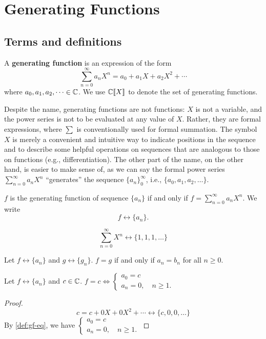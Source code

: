 \documentclass[a4paper, 12pt]{report}
\begin{document}
{\let\clearpage\relax\chapter{Generating Functions}\label{ch:gf}}
\section{Terms and definitions}
\begin{defn}\label{def:gf-def}
A \textbf{generating function} is an expression of the form 
\[\sum_{n = 0}^{\infty} a_n X^n = a_0 + a_1 X + a_2 X^2 + \cdots\]
where $a_0, a_1, a_2, \dots \in \mathbb{C}$. We use $\mathbb{C}\llbracket X \rrbracket$ to denote the set of generating functions.
\end{defn}

Despite the name, generating functions are not functions: $X$ is not a variable, and the power series is not to be evaluated at any value of $X$. Rather, they are formal expressions, where $\sum$ is conventionally used for formal summation. The symbol $X$ is merely a convenient and intuitive way to indicate positions in the sequence and to describe some helpful operations on sequences that are analogous to those on functions (e.g., differentiation). The other part of the name, on the other hand, is easier to make sense of, as we can say the formal power series $\sum_{n = 0}^{\infty} a_n X^n$ ``generates'' the sequence $\{a_n\}_0^\infty$, i.e., $\{a_0, a_1, a_2, \dots\}$.

\begin{defn}\label{def:gf-seq}
 $f$ is the generating function of sequence $\{a_n\}$ if and only if $f = \sum_{n = 0}^{\infty} a_n X^n$. We write 
 \[f \longleftrightarrow \{a_n\}.\]
\end{defn}
\begin{ex*}\label{ex:gf-111}
$$\sum_{n = 0}^\infty X^n \longleftrightarrow \{1, 1, 1, \dots\}$$
\end{ex*}

\begin{defn}\label{def:gf-eq}
Let $f \longleftrightarrow \{a_n\}$ and $g \longleftrightarrow \{g_n\}$. $f = g$ if and only if $a_n = b_n$ for all $n \geq 0$.
\end{defn}

\begin{lem}\label{lem:gf-id-c}
Let $f \longleftrightarrow \{a_n\}$ and $c \in \mathbb{C}$. $f = c \iff \begin{cases}
    a_0 = c\\
    a_n = 0, \quad n \geq 1.
\end{cases}$
\end{lem}
\begin{proof}\label{proof:gf-id-c}
\[c = c + 0X + 0X^2 + \cdots \longleftrightarrow \{c, 0, 0, \dots\}\]
By \cref{def:gf-eq}, we have $\begin{cases}
a_0 = c\\
a_n = 0, \quad n \geq 1.
\end{cases}$
\end{proof}
\end{document}

